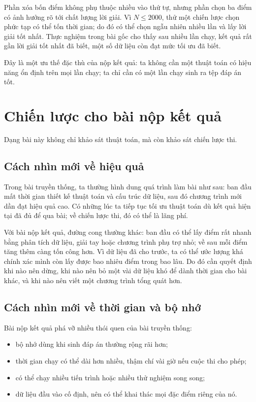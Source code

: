 \documentclass[11pt]{article}
\begin{document}
Phần xóa bốn điểm không phụ thuộc nhiều vào thứ tự, nhưng phần chọn ba điểm
có ảnh hưởng rõ tới chất lượng lời giải. Vì \(N\le 2000\), thử một chiến lược
chọn phức tạp có thể tốn thời gian; do đó có thể chọn ngẫu nhiên nhiều lần và
lấy lời giải tốt nhất. Thực nghiệm trong bài gốc cho thấy sau nhiều lần chạy,
kết quả rất gần lời giải tốt nhất đã biết, một số dữ liệu còn đạt mức tối ưu
đã biết.

Đây là một ưu thế đặc thù của nộp kết quả: ta không cần một thuật toán có
hiệu năng ổn định trên mọi lần chạy; ta chỉ cần có một lần chạy sinh ra tệp
đáp án tốt.

\section{Chiến lược cho bài nộp kết quả}

Dạng bài này không chỉ khảo sát thuật toán, mà còn khảo sát chiến lược thi.

\subsection{Cách nhìn mới về hiệu quả}

Trong bài truyền thống, ta thường hình dung quá trình làm bài như sau: ban
đầu mất thời gian thiết kế thuật toán và cấu trúc dữ liệu, sau đó chương trình
mới dần đạt hiệu quả cao. Có những lúc ta tiếp tục tối ưu thuật toán dù kết
quả hiện tại đã đủ để qua bài; về chiến lược thi, đó có thể là lãng phí.

Với bài nộp kết quả, đường cong thường khác: ban đầu có thể lấy điểm rất
nhanh bằng phân tích dữ liệu, giải tay hoặc chương trình phụ trợ nhỏ; về sau
mỗi điểm tăng thêm càng tốn công hơn. Vì dữ liệu đã cho trước, ta có thể ước
lượng khá chính xác mình còn lấy được bao nhiêu điểm trong bao lâu. Do đó
cần quyết định khi nào nên dừng, khi nào nên bỏ một vài dữ liệu khó để dành
thời gian cho bài khác, và khi nào nên viết một chương trình tổng quát hơn.

\subsection{Cách nhìn mới về thời gian và bộ nhớ}

Bài nộp kết quả phá vỡ nhiều thói quen của bài truyền thống:

\begin{itemize}
  \item bộ nhớ dùng khi sinh đáp án thường rộng rãi hơn;
  \item thời gian chạy có thể dài hơn nhiều, thậm chí vài giờ nếu cuộc thi cho
  phép;
  \item có thể chạy nhiều tiến trình hoặc nhiều thử nghiệm song song;
  \item dữ liệu đầu vào cố định, nên có thể khai thác mọi đặc điểm riêng của
  nó.
\end{itemize}
\end{document}

